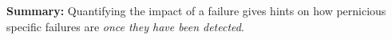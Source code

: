 

\noindent \textbf{Summary:} Quantifying the impact of a failure gives hints on how pernicious specific failures are \textit{once they have been detected}.%




